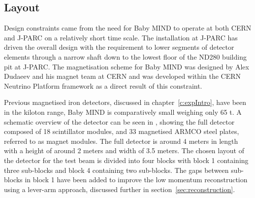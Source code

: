 
\subsection{Layout}
Design constraints came from the need for Baby MIND to operate at both CERN and J-PARC on a relatively short time scale. The installation at J-PARC has driven the overall design with the requirement to lower segments of detector elements through a narrow shaft down to the lowest floor of the ND280 building pit at J-PARC. The magnetisation scheme for Baby MIND was designed by Alex Dudaeev and his magnet team at CERN and was developed within the CERN Neutrino Platform framework as a direct result of this constraint.

Previous magnetised iron detectors, discussed in chapter~\ref{c:expIntro}, have been in the kiloton range, Baby MIND is comparatively small weighing only 65 t. A schematic overview of the detector can be seen in , showing the full detector composed of 18 scintillator modules, and 33 magnetised ARMCO steel plates, referred to as magnet modules. The full detector is around 4 meters in length with a height of around 2 meters and width of 3.5 meters. The chosen layout of the detector for the test beam is divided into four blocks with block 1 containing three sub-blocks and block 4 containing two sub-blocks. The gaps between sub-blocks in block 1 have been added to improve the low momentum reconstruction using a lever-arm approach, discussed further in section~\ref{sec:reconstruction}.




